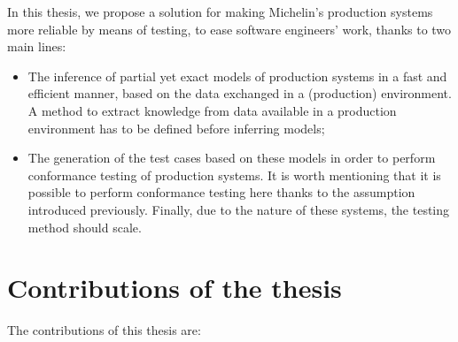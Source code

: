 In this thesis, we propose a solution for making Michelin's
production systems more reliable by means of testing, to ease
software engineers' work, thanks to two main lines:

\begin{itemize}
    \item The inference of partial yet exact models of production
        systems in a fast and efficient manner, based on the data
        exchanged in a (production) environment. A method to
        extract knowledge from data available in a production
        environment has to be defined before inferring models;

    \item The generation of the test cases based on these models
        in order to perform conformance testing of production
        systems. It is worth mentioning that it is possible to
        perform conformance testing here thanks to the assumption
        introduced previously. Finally, due to the nature of
        these systems, the testing method should scale.
\end{itemize}


\section{Contributions of the thesis}
\label{sec:intro:contrib}

The contributions of this thesis are:

